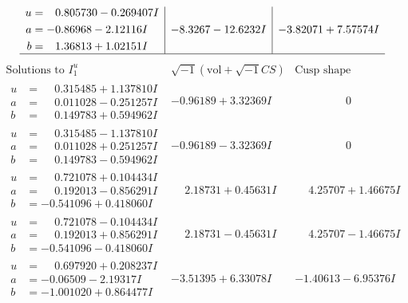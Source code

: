 \documentclass[1p]{elsarticle_modified}
\theoremstyle{definition}
\newcommand{\I}{\sqrt{-1}}
\begin{document}
$$\begin{array}{c|c|c}
\begin{aligned}
u &= \phantom{-}0.805730 - 0.269407 I \\
a &= -0.86968 - 2.12116 I \\
b &= \phantom{-}1.36813 + 1.02151 I\end{aligned}
 & -8.3267 - 12.6232 I & -3.82071 + 7.57574 I\\
 \hline 
 \end{array}$$\newpage$$\begin{array}{c|c|c}  
\text{Solutions to }I^u_{1}& \I (\text{vol} + \sqrt{-1}CS) & \text{Cusp shape}\\
 \hline 
\begin{aligned}
u &= \phantom{-}0.315485 + 1.137810 I \\
a &= \phantom{-}0.011028 - 0.251257 I \\
b &= \phantom{-}0.149783 + 0.594962 I\end{aligned}
 & -0.96189 + 3.32369 I & \phantom{-0.000000 } 0 \\ \hline\begin{aligned}
u &= \phantom{-}0.315485 - 1.137810 I \\
a &= \phantom{-}0.011028 + 0.251257 I \\
b &= \phantom{-}0.149783 - 0.594962 I\end{aligned}
 & -0.96189 - 3.32369 I & \phantom{-0.000000 } 0 \\ \hline\begin{aligned}
u &= \phantom{-}0.721078 + 0.104434 I \\
a &= \phantom{-}0.192013 - 0.856291 I \\
b &= -0.541096 + 0.418060 I\end{aligned}
 & \phantom{-}2.18731 + 0.45631 I & \phantom{-}4.25707 + 1.46675 I \\ \hline\begin{aligned}
u &= \phantom{-}0.721078 - 0.104434 I \\
a &= \phantom{-}0.192013 + 0.856291 I \\
b &= -0.541096 - 0.418060 I\end{aligned}
 & \phantom{-}2.18731 - 0.45631 I & \phantom{-}4.25707 - 1.46675 I \\ \hline\begin{aligned}
u &= \phantom{-}0.697920 + 0.208237 I \\
a &= -0.06509 - 2.19317 I \\
b &= -1.001020 + 0.864477 I\end{aligned}
 & -3.51395 + 6.33078 I & -1.40613 - 6.95376 I \\ \hline\begin{aligned}

\end{aligned}
\end{array}$$
\end{document}

